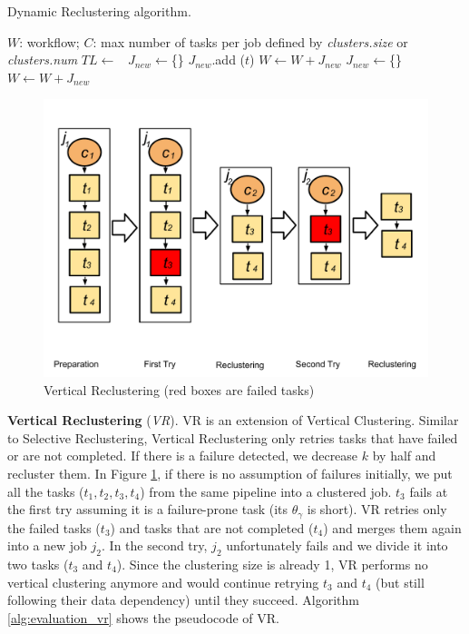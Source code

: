 \begin{algorithm}[!htb]
	\footnotesize
	\caption{Dynamic Reclustering algorithm.}
	\label{alg:evaluation_dr}
	\begin{algorithmic}[1]
		\Require $W$: workflow; $C$: max number of tasks per job defined by \emph{clusters.size} or \emph{clusters.num}
			\State $TL \gets$\ 
			\State $J_{new}\gets$\{\}
					\State $J_{new}$.add ($t$)
				\EndIf
					\State $W \gets W + J_{new}$
					\State $J_{new}\gets$\{\}
				\EndIf
			\EndFor
			\State $W \gets W + J_{new}$ 
		\EndProcedure
	\end{algorithmic}
\end{algorithm}

\begin{figure}[!htb]
\centering
  \includegraphics[width=0.65\linewidth]{figures/tolerance/vr.pdf}
  \caption{Vertical Reclustering (red boxes are failed tasks)}
  \label{fig:clustering_vr}
\end{figure}

\textbf{Vertical Reclustering} (\emph{VR}). VR is an extension of Vertical Clustering. Similar to Selective Reclustering, Vertical Reclustering only retries tasks that have failed or are not completed.
If there is a failure detected, we decrease $k$ by half and recluster them. In Figure \ref{fig:clustering_vr}, if there is no assumption of failures initially, we put all the tasks ($t_1, t_2, t_3, t_4$) from the same  pipeline into a clustered job. $t_3$ fails at the first try assuming it is a failure-prone task (its $\theta_{\gamma}$ is short). VR retries only the failed tasks ($t_3$) and tasks that are not completed ($t_4$) and merges them again into a new job $j_2$. In the second try, $j_2$ unfortunately fails and we divide it into two tasks ($t_3$ and $t_4$). Since the clustering size is already 1, VR performs no vertical clustering anymore and would continue retrying $t_3$ and $t_4$ (but still following their data dependency) until they succeed. Algorithm \ref{alg:evaluation_vr} shows the pseudocode of VR. 

